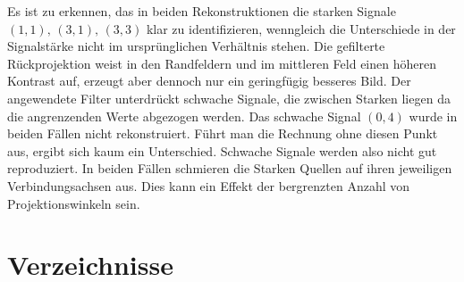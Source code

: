 \documentclass[slug=PET, room=Andreas-Schubert-Bau\,\ 424A, supervisor=Carsten\ Bittrich, coursedate=10.\ 01.\ 2020]{../../Lab_Report_LaTeX/lab_report}
\begin{document}
Es ist zu erkennen, das in beiden Rekonstruktionen die starken Signale
\((1,1),\,(3,1),\,(3,3)\) klar zu identifizieren, wenngleich die
Unterschiede in der Signalst\"arke nicht im urspr\"unglichen
Verh\"altnis stehen. Die gefilterte R\"uckprojektion weist in den
Randfeldern und im mittleren Feld einen h\"oheren Kontrast auf,
erzeugt aber dennoch nur ein geringf\"ugig besseres Bild.  Der
angewendete Filter unterdr\"uckt schwache Signale, die zwischen
Starken liegen da die angrenzenden Werte abgezogen werden.  Das
schwache Signal \((0,4)\) wurde in beiden F\"allen nicht
rekonstruiert. F\"uhrt man die Rechnung ohne diesen Punkt aus, ergibt
sich kaum ein Unterschied. Schwache Signale werden also nicht gut
reproduziert. In beiden F\"allen schmieren die Starken Quellen auf
ihren jeweiligen Verbindungsachsen aus. Dies kann ein Effekt der
bergrenzten Anzahl von Projektionswinkeln sein.

\newpage
\section{Verzeichnisse}
\label{sec:literatur}

\listoffigures

\listoftables

\printbibliography
\end{document}
